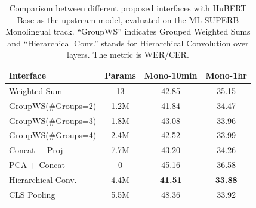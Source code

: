 \begin{table}[th]
  \caption{Comparison between different proposed interfaces with HuBERT Base as the upstream model, evaluated on the ML-SUPERB Monolingual track. ``GroupWS'' indicates Grouped Weighted Sums and ``Hierarchical Conv.'' stands for Hierarchical Convolution over layers. The metric is WER/CER.}
  \label{tab:preliminary}
  \centering
  \begin{tabular}{ l c c c }
    \toprule
    Interface & Params & Mono-10min & Mono-1hr \\
    \midrule
    Weighted Sum & 13 & 42.85           & 35.15 \\
    \midrule
    GroupWS(\#Groups=2) & 1.2M & 41.84     & 34.47 \\
    GroupWS(\#Groups=3) & 1.8M & 43.08     & 33.96 \\
    GroupWS(\#Groups=4) & 2.4M & 42.52     & 33.99 \\
    Concat $+$ Proj & 7.7M & 43.20      & 34.26 \\
    PCA $+$ Concat & 0 & 45.16          & 36.58 \\
    Hierarchical Conv. & 4.4M & \textbf{41.51}   & \textbf{33.88} \\
    CLS Pooling & 5.5M & 48.36          & 33.92 \\

    \bottomrule
  \end{tabular}
  \vspace{-15pt}
\end{table}

